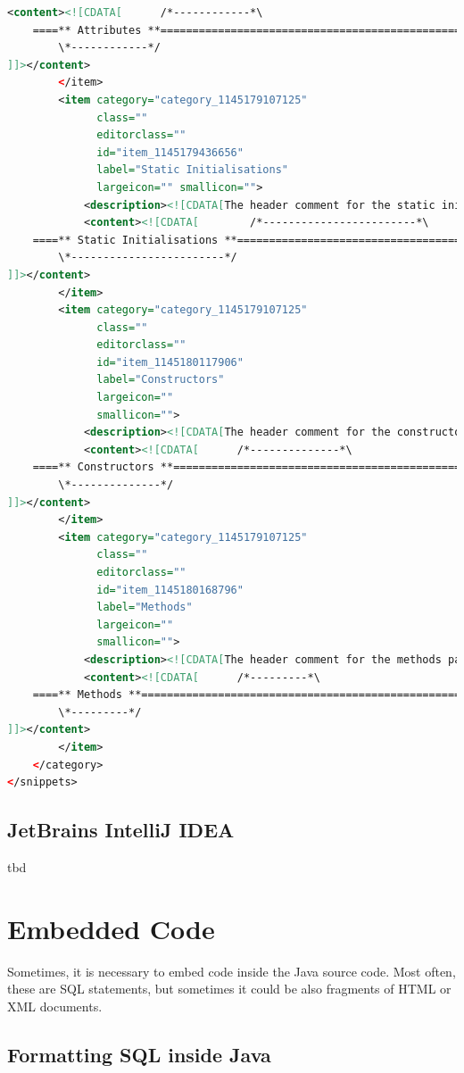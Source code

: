 \documentclass[12pt,a4paper,titlepage, parskip=half, headsepline, footsepline, cleardoubleplain]{scrbook}
\begin{document}
\begin{lstlisting}[language=XML,basicstyle=\ttfamily\footnotesize]
            <content><![CDATA[      /*------------*\
    ====** Attributes **=======================================================
        \*------------*/
]]></content>
        </item>
        <item category="category_1145179107125"
              class=""
              editorclass=""
              id="item_1145179436656"
              label="Static Initialisations"
              largeicon="" smallicon="">
            <description><![CDATA[The header comment for the static initialisations part]]></description>
            <content><![CDATA[        /*------------------------*\
    ====** Static Initialisations **===========================================
        \*------------------------*/
]]></content>
        </item>
        <item category="category_1145179107125"
              class=""
              editorclass=""
              id="item_1145180117906"
              label="Constructors"
              largeicon=""
              smallicon="">
            <description><![CDATA[The header comment for the constructors part]]></description>
            <content><![CDATA[    	/*--------------*\
    ====** Constructors **=====================================================
        \*--------------*/
]]></content>
        </item>
        <item category="category_1145179107125"
              class=""
              editorclass=""
              id="item_1145180168796"
              label="Methods"
              largeicon=""
              smallicon="">
            <description><![CDATA[The header comment for the methods part]]></description>
            <content><![CDATA[    	/*---------*\
    ====** Methods **==========================================================
        \*---------*/
]]></content>
        </item>
    </category>
</snippets>
\end{lstlisting}

\subsection{JetBrains IntelliJ IDEA}\label{sec:IntelliJConfiguration}
tbd

\section{Embedded Code}
Sometimes, it is necessary to embed code inside the Java source code. Most often, these are SQL statements, but sometimes it could be also fragments of HTML or XML documents.

\subsection{Formatting SQL inside Java}\label{sec:FormattingSQLInsideJava}
\end{document}
